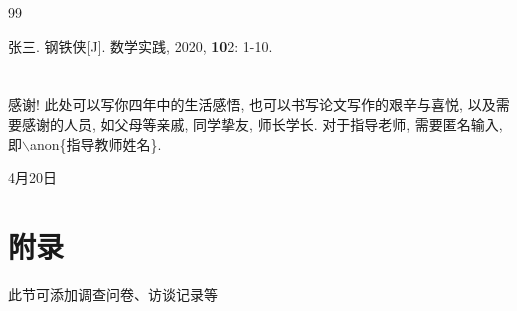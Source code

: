 \documentclass[a4paper,12pt,twoside]{ctexart}
\def\authorname{作者} %
\begin{document}
\newpage

\begin{thebibliography}{99}
\setlength{\itemsep}{-0.75ex}
张三. 钢铁侠[J]. 数学实践, 2020, \textbf{10}2: 1-10.
\end{thebibliography}
\newpage
\section*{}
感谢! 此处可以写你四年中的生活感悟, 也可以书写论文写作的艰辛与喜悦, 以及需要感谢的人员, 如父母等亲戚, 同学挚友, 师长学长. 对于指导老师, 需要匿名输入, 即$\backslash$anon\{指导教师姓名\}.

\begin{flushright}
    \anon{\authorname}\qquad\mbox{}

    \number{}4月20日
\end{flushright}

\newpage
\section*{附录}
此节可添加调查问卷、访谈记录等
\end{document}
